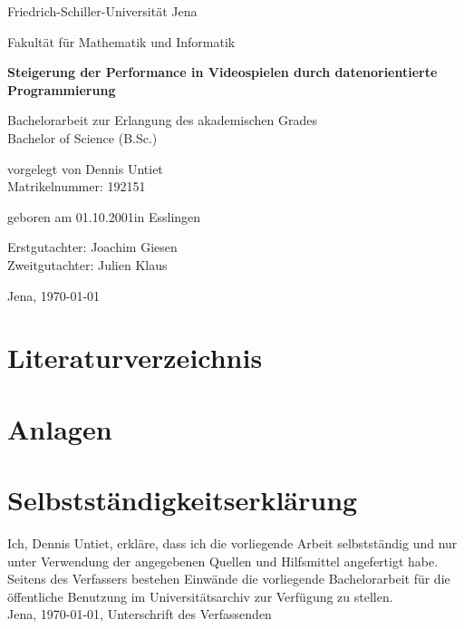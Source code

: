 \documentclass[12pt, titlepage]{article}
\DeclareRobustCommand{\#}{\adjustbox{valign=B,totalheight=.57\baselineskip}{\oldhash}}%
\newcommand{\myTitle}{Steigerung der Performance in Videospielen durch datenorientierte Programmierung}
\begin{document}
\begin{titlepage}
\centering
{\huge Friedrich-Schiller-Universität Jena \par}
{\large Fakultät für Mathematik und Informatik\par}
\vspace{1.5cm}
{\huge\bfseries \myTitle\par}
\vspace{2cm}
{\Large Bachelorarbeit zur Erlangung des akademischen Grades\\Bachelor of Science (B.Sc.) \par}
\vspace{3cm}
{\large vorgelegt von Dennis Untiet\\Matrikelnummer: 192151\par}
\vspace{0.5cm}
{\large geboren am 01.10.2001\quad in Esslingen\par}
\vspace{2cm}
{\large Erstgutachter: Joachim Giesen \\Zweitgutachter: Julien Klaus\par} 
\vfill
{\Large Jena, \today}
\end{titlepage}
\newpage 
\thispagestyle{empty}
\quad
\newpage

\newpage
\thispagestyle{empty}
\quad
\newpage
\tableofcontents
\newpage 
\thispagestyle{empty}
\quad
\newpage

\newpage

\newpage

\newpage

\newpage

\newpage

\newpage 
\thispagestyle{empty}
\quad
\newpage
\lstlistoflistings
\newpage
\listoffigures
\newpage
\section{Literaturverzeichnis}



\newpage
\section{Anlagen}
\newpage
\thispagestyle{empty}
\section*{Selbstständigkeitserklärung}
Ich, Dennis Untiet, erkläre, dass ich die vorliegende Arbeit selbstständig und nur unter Verwendung der
angegebenen Quellen und Hilfsmittel angefertigt habe.\\
Seitens des Verfassers bestehen Einwände die vorliegende Bachelorarbeit für die öffentliche Benutzung im
Universitätsarchiv zur Verfügung zu stellen.\\
Jena, \today, Unterschrift des Verfassenden
\end{document}
